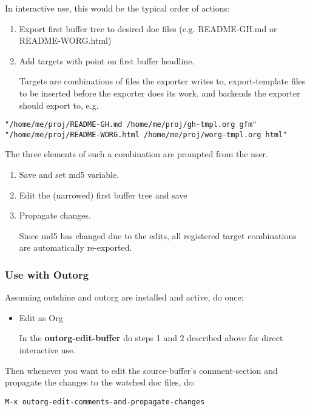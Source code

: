 \documentclass[11pt]{article}
\begin{document}
In interactive use, this would be the typical order of actions:

\begin{enumerate}
\item Export first buffer tree to desired doc files
(e.g. README-GH.md or README-WORG.html)

\item Add targets with point on first buffer headline.

Targets are combinations of files the exporter writes to,
export-template files to be inserted before the exporter does
its work, and backends the exporter should export to, e.g.
\end{enumerate}

\begin{verbatim}
"/home/me/proj/README-GH.md /home/me/proj/gh-tmpl.org gfm"
"/home/me/proj/README-WORG.html /home/me/proj/worg-tmpl.org html"
\end{verbatim}

The three elements of such a combination are prompted from
the user.

\begin{enumerate}
\item Save and set md5 variable.

\item Edit the (narrowed) first buffer tree and save

\item Propagate changes.

Since md5 has changed due to the edits, all registered target
combinations are automatically re-exported.
\end{enumerate}
\subsubsection{Use with Outorg}
\label{sec-1-4-3}

Assuming outshine and outorg are installed and active, do once:

\begin{itemize}
\item Edit as Org

In the \textbf{outorg-edit-buffer} do steps 1 and 2 described above
for direct interactive use.
\end{itemize}

Then whenever you want to edit the source-buffer's
comment-section and propagate the changes to the watched doc
files, do:

\begin{verbatim}
M-x outorg-edit-comments-and-propagate-changes
\end{verbatim}
\end{document}
